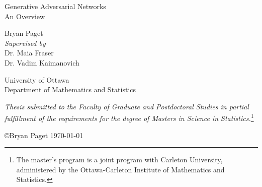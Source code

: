 \begin{titlepage}
  \sffamily
  \begin{center}
    \vspace{0.05cm}
    \vspace{0.7cm}
    \Huge Generative Adversarial Networks \\
    \LARGE An Overview \\
    \vspace{0.7cm}
    \vspace{6cm}

    {\huge Bryan Paget} \\
      \vspace{0.7cm}
    \textit{
      \large Supervised by} \\
    \vspace{0.3cm}
    \Large Dr. Maia Fraser \\
    Dr. Vadim Kaimanovich \\

    \vspace{1cm}

    \huge
    University of Ottawa \\
    \normalsize
    Department of Mathematics and Statistics \\

    \vspace{1cm}

    \small \textit{Thesis submitted to the Faculty of Graduate and Postdoctoral
      Studies in partial \\ fulfillment of the requirements for the degree of
      Masters in Science in Statistics.}\footnote{\sffamily The master's program
      is a joint program with Carleton University, administered by the
      Ottawa-Carleton Institute of Mathematics and Statistics.}

    \vspace*{\fill}

    \small \copyright Bryan Paget \today

  \end{center}
\end{titlepage}

\afterpage{\null\blankpage}

